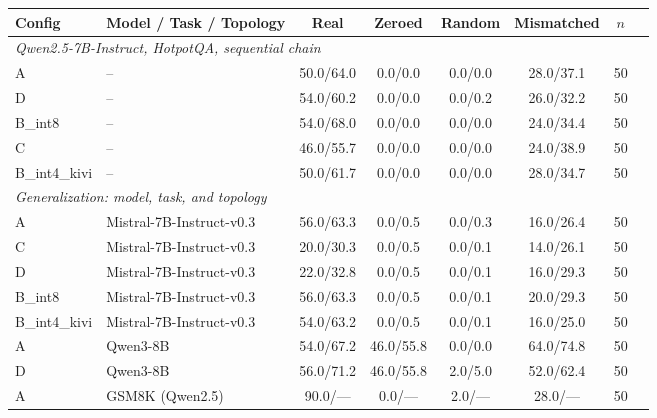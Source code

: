 
\begin{table}[t]
\centering
\small
\begin{tabular}{llcccccc}
\toprule
\textbf{Config} & \textbf{Model / Task / Topology} & \textbf{Real} & \textbf{Zeroed} & \textbf{Random} & \textbf{Mismatched} & \textbf{$n$} \\
\midrule
\multicolumn{7}{l}{\emph{Qwen2.5-7B-Instruct, HotpotQA, sequential chain}} \\
A            & --                          & 50.0/64.0 & 0.0/0.0  & 0.0/0.0  & 28.0/37.1 & 50 \\
D            & --                          & 54.0/60.2 & 0.0/0.0  & 0.0/0.2  & 26.0/32.2 & 50 \\
B\_int8      & --                          & 54.0/68.0 & 0.0/0.0  & 0.0/0.0  & 24.0/34.4 & 50 \\
C            & --                          & 46.0/55.7 & 0.0/0.0  & 0.0/0.0  & 24.0/38.9 & 50 \\
B\_int4\_kivi& --                          & 50.0/61.7 & 0.0/0.0  & 0.0/0.0  & 28.0/34.7 & 50 \\
\midrule
\multicolumn{7}{l}{\emph{Generalization: model, task, and topology}} \\
A            & Mistral-7B-Instruct-v0.3    & 56.0/63.3 & 0.0/0.5  & 0.0/0.3  & 16.0/26.4 & 50 \\
C            & Mistral-7B-Instruct-v0.3    & 20.0/30.3 & 0.0/0.5  & 0.0/0.1  & 14.0/26.1 & 50 \\
D            & Mistral-7B-Instruct-v0.3    & 22.0/32.8 & 0.0/0.5  & 0.0/0.1  & 16.0/29.3 & 50 \\
B\_int8      & Mistral-7B-Instruct-v0.3    & 56.0/63.3 & 0.0/0.5  & 0.0/0.1  & 20.0/29.3 & 50 \\
B\_int4\_kivi& Mistral-7B-Instruct-v0.3    & 54.0/63.2 & 0.0/0.5  & 0.0/0.1  & 16.0/25.0 & 50 \\
A            & Qwen3-8B                    & 54.0/67.2 & 46.0/55.8& 0.0/0.0  & 64.0/74.8 & 50 \\
D            & Qwen3-8B                    & 56.0/71.2 & 46.0/55.8& 2.0/5.0  & 52.0/62.4 & 50 \\
A            & GSM8K (Qwen2.5)             & 90.0/---  & 0.0/---  & 2.0/---  & 28.0/---  & 50 \\

\end{tabular}
\end{table}
